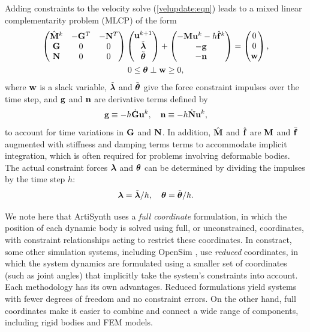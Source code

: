 Adding constraints to the velocity solve (\ref{velupdate:eqn})
leads to a mixed linear complementarity problem (MLCP)
of the form
\begin{gather}
\left(
\begin{matrix}
\hat{{\bf M}}^{k} & -{\bf G}^{T} & -{\bf N}^{T} \\
{\bf G} & 0 & 0 \\
{\bf N} & 0 & 0 
\end{matrix}
\right)
\left(
\begin{matrix}
{\bf u}^{k+1} \\
\tilde{\boldsymbol\lambda} \\
\tilde{\boldsymbol\theta}
\end{matrix}
\right)
+
\left(
\begin{matrix}
-{\bf M} {\bf u}^{k} - h \hat{{\bf f}}^{k} \\
-{\bf g} \\
-{\bf n}
\end{matrix}
\right)
=
\left(
\begin{matrix}
0 \\
0 \\
{\bf w}
\end{matrix}
\right), \notag \\
0 \le \boldsymbol\theta \perp {\bf w} \ge 0,
\label{KKTvelocity:eqn}
\end{gather}
where ${\bf w}$ is a slack variable, $\tilde{\boldsymbol\lambda}$ and $\tilde{\boldsymbol\theta}$ give the force
constraint impulses over the time step, and ${\bf g}$ and ${\bf n}$ are
derivative terms defined by
%
\begin{equation}
{\bf g} \equiv -h \dot{{\bf G}} {\bf u}^k, \quad {\bf n} \equiv -h \dot{{\bf N}} {\bf u}^k,
\end{equation}
%
to account for time variations in ${\bf G}$ and ${\bf N}$.
In addition,
$\hat{{\bf M}}$ and $\hat{{\bf f}}$ are ${\bf M}$ and $\bar{{\bf f}}$ augmented with stiffness
and damping terms terms to accommodate implicit integration, which
is often required for problems involving deformable bodies.
The actual constraint forces $\boldsymbol\lambda$ and $\boldsymbol\theta$ can be determined
by dividing the impulses by the time step $h$:
%
\begin{equation}
\boldsymbol\lambda = \tilde{\boldsymbol\lambda}/h, \quad \boldsymbol\theta = \tilde{\boldsymbol\theta}/h.
\label{impulsesToForces:eqn}
\end{equation}
%

We note here that ArtiSynth uses a {\it full coordinate} formulation,
in which the position of each dynamic body is solved using full, or
unconstrained, coordinates, with constraint relationships acting to
restrict these coordinates. In constract, some other simulation
systems, including OpenSim \cite{delp2007opensim}, use {\it reduced}
coordinates, in which the system dynamics are formulated using a
smaller set of coordinates (such as joint angles) that implicitly take
the system's constraints into account. Each methodology has its own
advantages. Reduced formulations yield systems with fewer degrees of
freedom and no constraint errors. On the other hand, full coordinates
make it easier to combine and connect a wide range of components,
including rigid bodies and FEM models.

